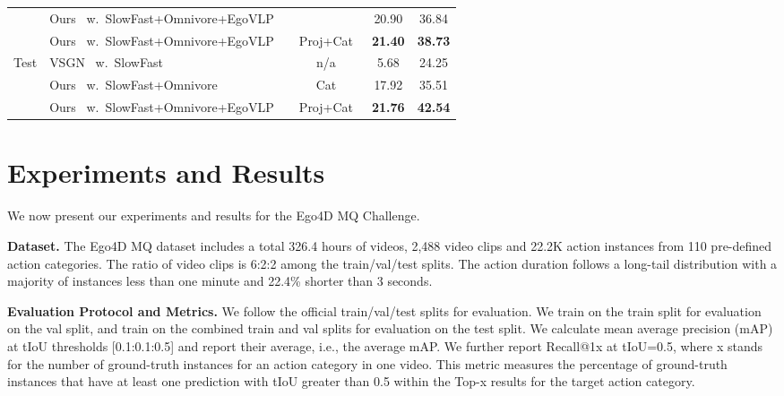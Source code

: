 \documentclass[runningheads]{llncs}
\begin{document}
\begin{table}[t]
{\begin{tabular}{c|l|c|c|c}
& Ours~\cite{zhang2022actionformer} w.~SlowFast+Omnivore+EgoVLP~               &                      & 20.90                                                                  & 36.84 \tabularnewline \cline{2-5}                                                                             
& Ours~\cite{zhang2022actionformer} w.~SlowFast+Omnivore+EgoVLP~               & ~Proj+Cat~            & \textbf{21.40}                                                         & \textbf{38.73}                                                                   \\ 
\hline\hline
\multirow{3}{*}{Test} & VSGN~\cite{zhao2021video} w.~SlowFast                              & n/a                  & 5.68                                                                   & 24.25 \tabularnewline \cline{2-5}   
& Ours~\cite{zhang2022actionformer} w.~SlowFast+Omnivore                     & Cat                  & 17.92                                                                  & 35.51 \tabularnewline\cline{2-5}   
& Ours~\cite{zhang2022actionformer} w.~SlowFast+Omnivore+EgoVLP~               & ~Proj+Cat~            & \textbf{21.76}                                                         & \textbf{42.54} \\
\hline
\end{tabular}\label{tab:results}
}\vspace{-1.5em}
\end{table}

\section{Experiments and Results}

We now present our experiments and results for the Ego4D MQ Challenge.\smallskip

\noindent \textbf{Dataset.} The Ego4D MQ dataset includes a total 326.4 hours of videos, 2,488 video clips and 22.2K action instances from 110 pre-defined action categories. The ratio of video clips is 6:2:2 among the train/val/test splits. The action duration follows a long-tail distribution with a majority of instances less than one minute and 22.4\% shorter than 3 seconds.\smallskip

\noindent \textbf{Evaluation Protocol and Metrics.} We follow the official train/val/test splits for evaluation. We train on the train split for evaluation on the val split, and train on the combined train and val splits for evaluation on the test split. We calculate mean average precision (mAP) at tIoU thresholds [0.1:0.1:0.5] and report their average, i.e., the average mAP. We further report Recall@1x at tIoU=0.5, where x stands for the number of ground-truth instances for an action category in one video. This metric measures the percentage of ground-truth instances that have at least one prediction with tIoU greater than 0.5 within the Top-x results for the target action category.\smallskip
\end{document}
